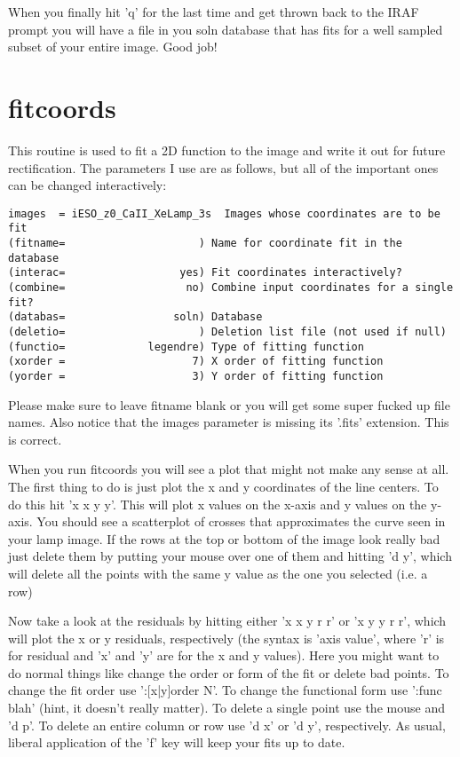 \documentclass[letter,11pt,oneside]{article}
\begin{document}
When you finally hit 'q' for the last time and get thrown back to the
IRAF prompt you will have a file in you soln database that has fits
for a well sampled subset of your entire image. Good job!

\section{fitcoords}

This routine is used to fit a 2D function to the image and write it
out for future rectification. The parameters I use are as follows, but
all of the important ones can be changed interactively:

\begingroup \fontsize{10pt}{10pt}
\selectfont
\begin{verbatim} 
images  = iESO_z0_CaII_XeLamp_3s  Images whose coordinates are to be fit
(fitname=                     ) Name for coordinate fit in the database
(interac=                  yes) Fit coordinates interactively?
(combine=                   no) Combine input coordinates for a single fit?
(databas=                 soln) Database
(deletio=                     ) Deletion list file (not used if null)
(functio=             legendre) Type of fitting function
(xorder =                    7) X order of fitting function
(yorder =                    3) Y order of fitting function
\end{verbatim}
\endgroup

Please make sure to leave fitname blank or you will get some super
fucked up file names. Also notice that the images parameter is missing
its '.fits' extension. This is correct.

When you run fitcoords you will see a plot that might not make any
sense at all. The first thing to do is just plot the x and y
coordinates of the line centers. To do this hit 'x x y y'. This will
plot x values on the x-axis and y values on the y-axis. You should see
a scatterplot of crosses that approximates the curve seen in your lamp
image. If the rows at the top or bottom of the image look really bad
just delete them by putting your mouse over one of them and hitting 'd
y', which will delete all the points with the same y value as the one
you selected (i.e. a row)


Now take a look at the residuals by hitting either 'x x y r r' or 'x y
y r r', which will plot the x or y residuals, respectively (the syntax
is 'axis value', where 'r' is for residual and 'x' and 'y' are for the
x and y values). Here you might want to do normal things like change
the order or form of the fit or delete bad points. To change the fit
order use ':[x|y]order N'. To change the functional form use ':func
blah' (hint, it doesn't really matter). To delete a single point use
the mouse and 'd p'. To delete an entire column or row use 'd x' or 'd
y', respectively. As usual, liberal application of the 'f' key will
keep your fits up to date.
\end{document}
